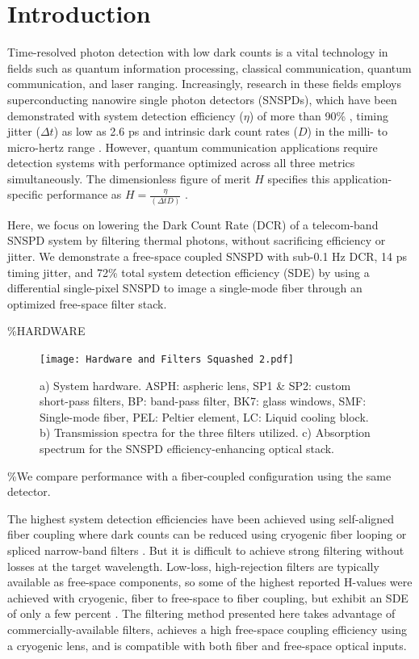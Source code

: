 \documentclass[12pt]{caltech_thesis}
\begin{document}
\hypertarget{introduction}{%
\section{Introduction}\label{introduction}}

Time-resolved photon detection with low dark counts is a vital
technology in fields such as quantum information processing, classical
communication, quantum communication, and laser ranging. Increasingly,
research in these fields employs superconducting nanowire single photon
detectors (SNSPDs), which have been demonstrated with system detection
efficiency (\(\eta\)) of more than 90\% \autocite{Reddy2020}, timing
jitter (\(\Delta t\)) as low as 2.6 ps \autocite{Korzh2020} and
intrinsic dark count rates (\(D\)) in the milli- to micro-hertz range
\autocite{Hochberg2019}. However, quantum communication applications
require detection systems with performance optimized across all three
metrics simultaneously. The dimensionless figure of merit \(H\)
specifies this application-specific performance as
\(H = \frac{\eta}{(\Delta t D)}\) \autocite{Hadfield2009}.

Here, we focus on lowering the Dark Count Rate (DCR) of a telecom-band
SNSPD system by filtering thermal photons, without sacrificing
efficiency or jitter. We demonstrate a free-space coupled SNSPD with
sub-0.1 Hz DCR, 14 ps timing jitter, and 72\% total system detection
efficiency (SDE) by using a differential single-pixel SNSPD
\autocite{Colangelo2021} to image a single-mode fiber through an
optimized free-space filter stack.

\%HARDWARE

\begin{figure}[htbp]
\centering\texttt{[image: Hardware and Filters Squashed 2.pdf]}
\caption{\small a) System hardware. ASPH: aspheric lens, %
SP1 \& SP2: custom short-pass filters, BP: band-pass filter, %
BK7: glass windows, SMF: Single-mode fiber, PEL: Peltier element, LC: Liquid cooling block. b) Transmission spectra for the three filters utilized. c) Absorption spectrum for the SNSPD efficiency-enhancing optical stack.}
\label{fig:setup}
\end{figure}

\%We compare performance with a fiber-coupled configuration using the
same detector.

The highest system detection efficiencies have been achieved using
self-aligned fiber coupling where dark counts can be reduced using
cryogenic fiber looping \autocite{Cohen2015} or spliced narrow-band
filters \autocite{Boaron2018secure}. But it is difficult to achieve
strong filtering without losses at the target wavelength. Low-loss,
high-rejection filters are typically available as free-space components,
so some of the highest reported H-values were achieved with cryogenic,
fiber to free-space to fiber coupling, but exhibit an SDE of only a few
percent \autocite{Shibata2015}. The filtering method presented here
takes advantage of commercially-available filters, achieves a high
free-space coupling efficiency using a cryogenic lens, and is compatible
with both fiber and free-space optical inputs.
\end{document}
